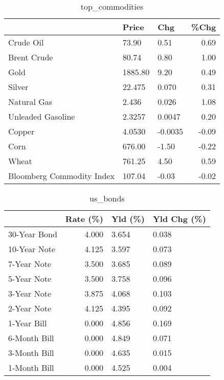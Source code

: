 \documentclass{article}%
\begin{document}
\begin{table}[htbp]%
\caption{top\_commodities}%
\centering%
\begin{adjustbox}{width=1\textwidth}%
\begin{tabular}{lllr}
\toprule
                          &   Price &     Chg &  \%Chg \\
\midrule
               Crude Oil  &   73.90 &    0.51 &  0.69 \\
             Brent Crude  &   80.74 &    0.80 &  1.00 \\
                    Gold  & 1885.80 &    9.20 &  0.49 \\
                  Silver  &  22.475 &   0.070 &  0.31 \\
             Natural Gas  &   2.436 &   0.026 &  1.08 \\
       Unleaded Gasoline  &  2.3257 &  0.0047 &  0.20 \\
                  Copper  &  4.0530 & -0.0035 & -0.09 \\
                    Corn  &  676.00 &   -1.50 & -0.22 \\
                   Wheat  &  761.25 &    4.50 &  0.59 \\
Bloomberg Commodity Index &  107.04 &   -0.03 & -0.02 \\
\bottomrule
\end{tabular}
%
\end{adjustbox}%
\end{table}

%


\begin{table}[htbp]%
\caption{us\_bonds}%
\centering%
\begin{adjustbox}{width=1\textwidth}%
\begin{tabular}{lrll}
\toprule
             &  Rate (\%) & Yld (\%) & Yld Chg (\%) \\
\midrule
30-Year Bond &     4.000 &   3.654 &       0.038 \\
10-Year Note &     4.125 &   3.597 &       0.073 \\
 7-Year Note &     3.500 &   3.685 &       0.089 \\
 5-Year Note &     3.500 &   3.758 &       0.096 \\
 3-Year Note &     3.875 &   4.068 &       0.103 \\
 2-Year Note &     4.125 &   4.395 &       0.092 \\
 1-Year Bill &     0.000 &   4.856 &       0.169 \\
6-Month Bill &     0.000 &   4.849 &       0.071 \\
3-Month Bill &     0.000 &   4.635 &       0.015 \\
1-Month Bill &     0.000 &   4.525 &       0.004 \\
\bottomrule
\end{tabular}
%
\end{adjustbox}%
\end{table}
\end{document}

